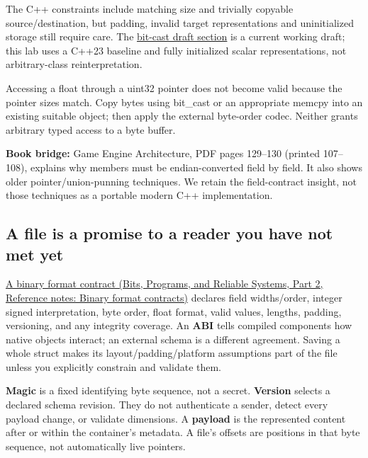 The C++ constraints include matching size and trivially copyable source/destination, but padding, invalid target representations and uninitialized storage still require care. The \href{https://eel.is/c++draft/bit.cast}{bit-cast draft section} is a current working draft; this lab uses a C++23 baseline and fully initialized scalar representations, not arbitrary-class reinterpretation.

Accessing a float through a uint32 pointer does not become valid because the pointer sizes match. Copy bytes using bit\_cast or an appropriate memcpy into an existing suitable object; then apply the external byte-order codec. Neither grants arbitrary typed access to a byte buffer.

\textbf{Book bridge:} Game Engine Architecture, PDF pages 129--130 (printed 107--108), explains why members must be endian-converted field by field. It also shows older pointer/union-punning techniques. We retain the field-contract insight, not those techniques as a portable modern C++ implementation.

\subsection{A file is a promise to a reader you have not met yet}\label{05-engine-i-ch002-a-file-is-a-promise-to-a-reader-you-have-not-met-yet}

\hypertarget{05-engine-i-ch002-a-file-is-a-promise-to-a-reader-you-have-not-met-yet}{}

\href{../01-Bits-Programs-and-Reliable-Systems-P02/main.pdf\#appendix-590bbb2424c1}{A binary format contract (Bits, Programs, and Reliable Systems, Part 2, Reference notes: Binary format contracts)} declares field widths/order, integer signed interpretation, byte order, float format, valid values, lengths, padding, versioning, and any integrity coverage. An \textbf{ABI} tells compiled components how native objects interact; an external schema is a different agreement. Saving a whole struct makes its layout/padding/platform assumptions part of the file unless you explicitly constrain and validate them.

\textbf{Magic} is a fixed identifying byte sequence, not a secret. \textbf{Version} selects a declared schema revision. They do not authenticate a sender, detect every payload change, or validate dimensions. A \textbf{payload} is the represented content after or within the container's metadata. A file's offsets are positions in that byte sequence, not automatically live pointers.

